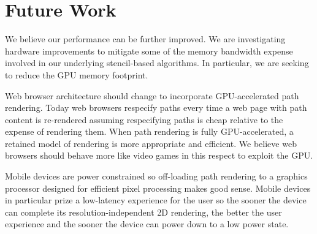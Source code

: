 
\section{Future Work}
\label{sec:future}

We believe our performance can be further improved.  We are investigating
hardware improvements to mitigate some of the memory bandwidth expense
involved in our underlying stencil-based algorithms.  In particular,
we are seeking to reduce the GPU memory footprint.

Web browser architecture should change to incorporate GPU-accelerated
path rendering.  Today web browsers
respecify paths every time a web page with path content is re-rendered
assuming respecifying paths is cheap relative to the expense of rendering them.
When path rendering is fully GPU-accelerated, a retained model of
rendering is more appropriate and  efficient.  We believe web browsers
should behave more like video games in this respect to exploit the GPU.

Mobile devices are power constrained so off-loading path rendering to
a graphics processor designed for efficient pixel processing
makes good sense.  Mobile devices in particular prize a low-latency
experience for the user so the sooner the device can complete its
resolution-independent 2D rendering, the better the user experience and
the sooner the device can power down to a low power state.

